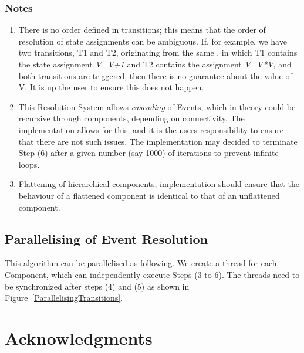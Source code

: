 \documentclass[draftspec]{ninemlspec}
\newcommand{\Regime}{\textbf{\class{Regime}}\xspace}
\begin{document}
\subsubsection{Notes}

\begin{enumerate}
\item  There is no order defined in transitions; this means
that the order of resolution of state assignments can be ambiguous. If, for
example, we have two transitions, T1 and T2, originating from the same \Regime,
in which T1 contains the state assignment \textsl{V=V+1} and T2 contains the
assignment \textsl{V=V*V}, and both transitions are triggered, then there is no
guarantee about the value of V. It is up the user to ensure this does not
happen.

\item This Resolution System allows \emph{cascading} of Events, which in theory
could be recursive through components, depending on connectivity. The
implementation allows for this; and it is the users responsibility to ensure
that there are not such issues. The implementation may decided to terminate
Step (6) after a given number (say 1000) of iterations to prevent infinite
loops.

\item Flattening of hierarchical components; implementation should ensure that
the behaviour of a flattened component is identical to that of an unflattened
component.
\end{enumerate}

\subsection{Parallelising of Event Resolution}

This algorithm can be parallelised as following. We create a thread for each
Component, which can independently execute Steps (3 to 6). The threads need
to be synchronized after steps (4) and (5) as shown in
Figure~\ref{ParallelisingTransitions}.


\section{Acknowledgments}



\clearpage




\end{document}
